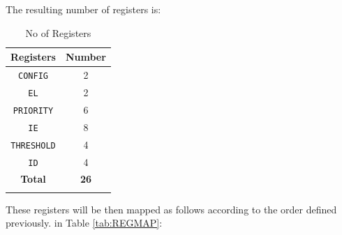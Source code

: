 The resulting number of registers is:

\begin{longtable}[c]{@{}cc@{}}	
		\toprule 
		\textbf{Registers} & \textbf{Number}\\
		\midrule 
		\endhead
		\texttt{CONFIG}    & 2\\
		\texttt{EL}        & 2\\
		\texttt{PRIORITY}  & 6\\
		\texttt{IE}        & 8\\
		\texttt{THRESHOLD} & 4\\
		\texttt{ID}        & 4\\
		\midrule
		\textbf{Total}     & \textbf{26}\\
		\bottomrule 	
	\caption{No of Registers}
	\label{tab:REGMAPNUM}
\end{longtable}

These registers will be then mapped as follows according to the order
defined 
\ifdefined\MARKDOWN
previously.
\else
in Table \ref{tab:REGMAP}:
\fi

